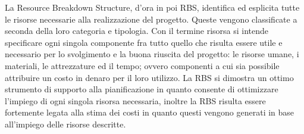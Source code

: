 La Resource Breakdown Structure, d'ora in poi RBS, identifica ed esplicita tutte le
risorse necessarie alla realizzazione del progetto. Queste vengono classificate a seconda della
loro categoria e tipologia. Con il termine risorsa si intende specificare ogni singola
componente fra tutto quello che risulta essere utile e necessario per lo svolgimento e la
buona riuscita del progetto: le risorse umane, i materiali, le attrezzature ed il tempo;
ovvero componenti a cui sia possibile attribuire un costo in denaro per il loro utilizzo. La
RBS si dimostra un ottimo strumento di supporto alla pianificazione in quanto consente
di ottimizzare l'impiego di ogni singola risorsa necessaria, inoltre la RBS risulta essere fortemente
legata alla stima dei costi in quanto questi vengono generati in base all'impiego delle
risorse descritte.
